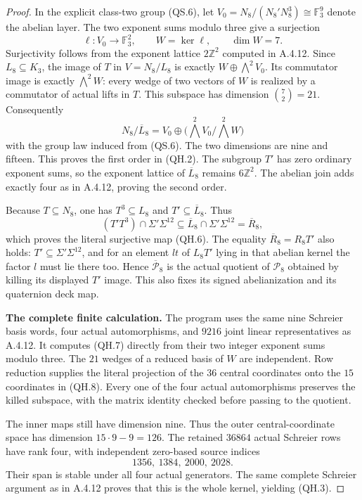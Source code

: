\begin{proof}
In the explicit class-two group (QS.6), let
$V_0=N_8/(N_8'N_8^3)\cong\mathbb F_3^9$ denote the
abelian layer.
The two exponent sums modulo three give a surjection
\[
 \ell:V_0\longrightarrow\mathbb F_3^2,
 \qquad W=\ker\ell,\qquad\dim W=7.                     \tag{QH.7}
\]
Surjectivity follows from the exponent lattice
$2\mathbb Z^2$ computed in A.4.12.  Since $L_8\subseteq K_3$,
the image of $T$ in $V=N_8/L_8$ is exactly
$W\oplus\bigwedge^2V_0$.  Its commutator image is exactly
$\bigwedge^2W$: every wedge of two vectors of $W$ is
realized by a commutator of actual lifts in $T$.
This subspace has dimension $\binom72=21$.  Consequently
\[
 N_8/\overline L_8
    =V_0\oplus\bigl(\bigwedge^2V_0/\bigwedge^2W\bigr)
                                                        \tag{QH.8}
\]
with the group law induced from (QS.6).  The two dimensions
are nine and fifteen.  This proves the first order in
(QH.2).  The subgroup $T'$ has zero ordinary exponent sums,
so the exponent lattice of $\overline L_8$ remains
$6\mathbb Z^2$.  The abelian join adds exactly four as in
A.4.12, proving the second order.

Because $T\subseteq N_8$, one has $T^3\subseteq L_8$ and
$T'\subseteq\overline L_8$.  Thus
\[
 (T'T^3)\cap\Sigma'\Sigma^{12}
       \subseteq\overline L_8\cap\Sigma'\Sigma^{12}
       =\overline R_8,                                 \tag{QH.9}
\]
which proves the literal surjective map (QH.6).
The equality
$\overline R_8=R_8T'$ also holds: $T'\subseteq
\Sigma'\Sigma^{12}$, and for an element $lt$ of
$L_8T'$ lying in that abelian kernel the factor $l$ must
lie there too.  Hence $\overline{\mathcal P}_8$ is the
actual quotient of $\mathcal P_8$ obtained by killing
its displayed $T'$ image.  This also fixes its signed
abelianization and its quaternion deck map.

\textbf{The complete finite calculation.}
The program uses the same nine Schreier basis words,
four actual automorphisms, and $9216$ joint linear
representatives as A.4.12.  It computes (QH.7) directly
from their two integer exponent sums modulo three.
The $21$ wedges of a reduced basis of $W$ are independent.
Row reduction supplies the literal projection of the
$36$ central coordinates onto the $15$ coordinates in
(QH.8).  Every one of the four actual automorphisms
preserves the killed subspace, with the matrix identity
checked before passing to the quotient.

The inner maps still have dimension nine.  Thus the
outer central-coordinate space has dimension
$15\cdot9-9=126$.  The retained $36864$ actual Schreier
rows have rank four, with independent zero-based source
indices
\[
                     1356,\ 1384,\ 2000,\ 2028.         \tag{QH.10}
\]
Their span is stable under all four actual generators.
The same complete Schreier argument as in A.4.12 proves
that this is the whole kernel, yielding (QH.3).


\end{proof}
